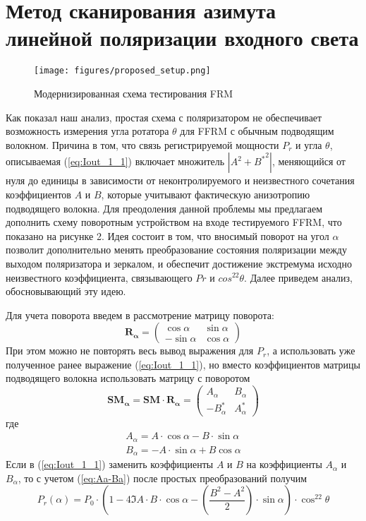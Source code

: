 \documentclass{article}
\begin{document}
\section{Метод сканирования азимута линейной поляризации входного света}
\begin{figure}[b]
	\centering
	\texttt{[image: figures/proposed\_setup.png]}
	\caption{Модернизированная схема тестирования FRM}
	\label{fig:proposed_setup}
\end{figure} 
Как показал наш анализ, простая схема с поляризатором не обеспечивает возможность измерения угла ротатора $\theta$ для FFRM с обычным подводящим волокном. 
Причина в том, что связь регистрируемой мощности $P_r$ и угла $\theta$, описываемая (\ref{eq:Iout_1_1}) включает множитель $|A^2+{B^*}^2|$, меняющийся от нуля до единицы в зависимости от неконтролируемого и неизвестного сочетания коэффициентов $A$ и $B$, которые учитывают фактическую анизотропию подводящего волокна.
Для преодоления данной проблемы мы предлагаем дополнить схему поворотным устройством на входе тестируемого FFRM, что показано на рисунке 2.
Идея состоит в том, что вносимый поворот на угол $\alpha$ позволит дополнительно менять преобразование состояния поляризации между выходом поляризатора и зеркалом, и обеспечит достижение экстремума исходно неизвестного коэффициента, связывающего $Pr$ и $cos^22\theta$.
Далее приведем анализ, обосновывающий эту идею.     

Для учета поворота введем в рассмотрение матрицу поворота:
\begin{equation}
	\label{eq:rotMatrix}
	\bm{R_\alpha} = 
	\begin{pmatrix}
		\cos\alpha & \sin\alpha \\
		-\sin\alpha & \cos\alpha
	\end{pmatrix}	
\end{equation}
При этом можно не повторять весь вывод выражения для $P_r$, а использовать уже полученное ранее выражение (\ref{eq:Iout_1_1}), но вместо коэффициентов матрицы подводящего волокна использовать матрицу с поворотом
\begin{equation}
	\bm{SM_\alpha} = \bm{SM}\cdot\bm{R_\alpha}= 
	\begin{pmatrix}
		A_\alpha & B_\alpha \\
		-B^*_\alpha & A^*_\alpha
	\end{pmatrix}	
\end{equation}
где
\begin{equation}
   \label{eq:Aa-Ba}
    \begin{aligned}
        A_\alpha = A\cdot\cos\alpha-B\cdot\sin\alpha \\
        B_\alpha = -A\cdot\sin\alpha+B\cos\alpha
    \end{aligned}
\end{equation}
Если в (\ref{eq:Iout_1_1}) заменить коэффициенты $A$ и $B$ на коэффициенты $A_\alpha$ и $B_\alpha$, то с учетом (\ref{eq:Aa-Ba}) после простых преобразований получим
\begin{equation}
    \label{eq:Pr_our}
    P_r(\alpha)=P_0\cdot\left( 1-4\Im{A\cdot B\cdot \cos\alpha-\left( \frac{B^2-A^2}{2} \right)\cdot\sin\alpha} \right)\cdot\cos^22\theta
\end{equation}
\end{document}
